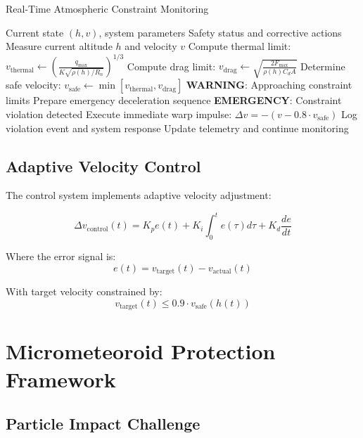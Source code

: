 \documentclass[12pt,a4paper]{article}
\begin{document}
\begin{algorithm}
\caption{Real-Time Atmospheric Constraint Monitoring}
\begin{algorithmic}
\Require Current state $(h, v)$, system parameters
\Ensure Safety status and corrective actions
\State Measure current altitude $h$ and velocity $v$
\State Compute thermal limit: $v_{\text{thermal}} \gets \left(\frac{q_{\max}}{K \sqrt{\rho(h)/R_n}}\right)^{1/3}$
\State Compute drag limit: $v_{\text{drag}} \gets \sqrt{\frac{2 F_{\max}}{\rho(h) C_d A}}$
\State Determine safe velocity: $v_{\text{safe}} \gets \min[v_{\text{thermal}}, v_{\text{drag}}]$
    \State \textbf{WARNING}: Approaching constraint limits
    \State Prepare emergency deceleration sequence
\EndIf
{}
    \State \textbf{EMERGENCY}: Constraint violation detected
    \State Execute immediate warp impulse: $\Delta v = -(v - 0.8 \cdot v_{\text{safe}})$
    \State Log violation event and system response
\EndIf
\State Update telemetry and continue monitoring
\end{algorithmic}
\end{algorithm}

\subsection{Adaptive Velocity Control}

The control system implements adaptive velocity adjustment:

\begin{equation}
\Delta v_{\text{control}}(t) = K_p e(t) + K_i \int_0^t e(\tau) d\tau + K_d \frac{de}{dt}
\end{equation}

Where the error signal is:
\begin{equation}
e(t) = v_{\text{target}}(t) - v_{\text{actual}}(t)
\end{equation}

With target velocity constrained by:
\begin{equation}
v_{\text{target}}(t) \leq 0.9 \cdot v_{\text{safe}}(h(t))
\end{equation}

\section{Micrometeoroid Protection Framework}

\subsection{Particle Impact Challenge}
\end{document}
